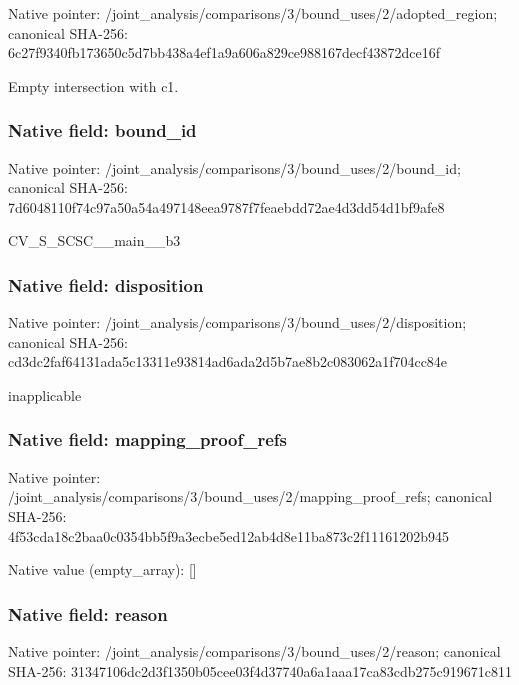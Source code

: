 \documentclass[10pt,a4paper]{article}
\begin{document}
Native pointer: /joint\_analysis/comparis\allowbreak{}ons/3/bound\_uses/2/adopt\allowbreak{}ed\_region; canonical SHA-256: 6c27f9340fb173650c5d7bb4\allowbreak{}38a4ef1a9a606a829ce98816\allowbreak{}7decf43872dce16f


Empty intersection with c1.


\subsubsection{Native field: bound\_id}


Native pointer: /joint\_analysis/comparis\allowbreak{}ons/3/bound\_uses/2/bound\allowbreak{}\_id; canonical SHA-256: 7d6048110f74c97a50a54a49\allowbreak{}7148eea9787f7feaebdd72ae\allowbreak{}4d3dd54d1bf9afe8


CV\_S\_SCSC\_\_main\_\_b3


\subsubsection{Native field: disposition}


Native pointer: /joint\_analysis/comparis\allowbreak{}ons/3/bound\_uses/2/dispo\allowbreak{}sition; canonical SHA-256: cd3dc2faf64131ada5c13311\allowbreak{}e93814ad6ada2d5b7ae8b2c0\allowbreak{}83062a1f704cc84e


inapplicable


\subsubsection{Native field: mapping\_proof\_refs}


Native pointer: /joint\_analysis/comparis\allowbreak{}ons/3/bound\_uses/2/mappi\allowbreak{}ng\_proof\_refs; canonical SHA-256: 4f53cda18c2baa0c0354bb5f\allowbreak{}9a3ecbe5ed12ab4d8e11ba87\allowbreak{}3c2f11161202b945



Native value (empty\_array): []



\subsubsection{Native field: reason}


Native pointer: /joint\_analysis/comparis\allowbreak{}ons/3/bound\_uses/2/reaso\allowbreak{}n; canonical SHA-256: 31347106dc2d3f1350b05cee\allowbreak{}03f4d37740a6a1aaa17ca83c\allowbreak{}db275c919671c811
\end{document}

